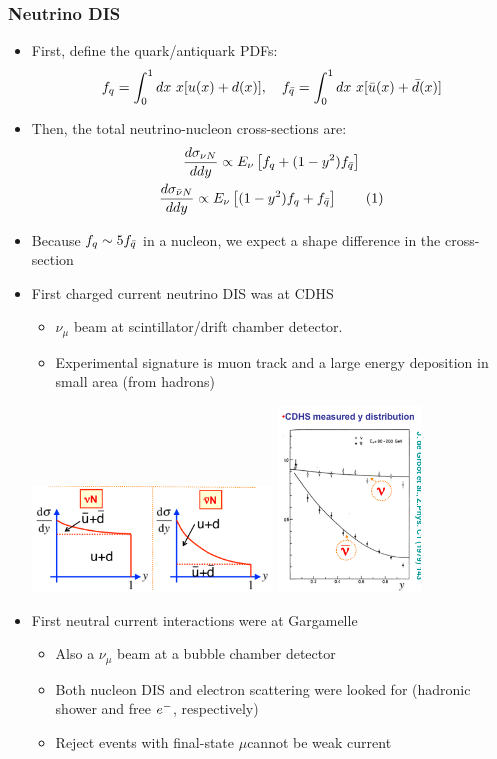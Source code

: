 \subsubsection{Neutrino DIS}
\begin{itemize}
  \item First, define the quark/antiquark PDFs:
  \begin{equation}
    f_q = \int_0^1 dx ~ x[u(x)+d(x)], \quad f_{\bar{q}} = \int_0^1 dx ~ x[\bar{u}(x)+\bar{d}(x)]
  \end{equation}
  \item Then, the total neutrino-nucleon cross-sections are:
  \begin{gather*}
    \dd{\sigma_{\nu N}}{dy} \propto E_\nu \left[ f_q + (1-y^2) f_\qbar\right]\\
    \dd{\sigma_{\nubar N}}{dy} \propto E_\nu \left[(1-y^2)  f_q + f_\qbar\right]\numberthis
  \end{gather*}
  \item Because $f_q \sim 5 f_{\bar{q}}$ in a nucleon, we expect a shape difference in the cross-section
  \item First charged current neutrino DIS was at CDHS
  \begin{itemize}
    \item $\nu_\mu$ beam at scintillator/drift chamber detector. 
    \item Experimental signature is muon track and a large energy deposition in small area (from hadrons)
  \end{itemize}
  \begin{center}
    \includegraphics[width=0.5\textwidth,valign=c]{figs/nudis.png}
    \includegraphics[width=0.3\textwidth,valign=c]{figs/cdhs.png}
  \end{center}
  \item First neutral current interactions were at Gargamelle
  \begin{itemize}
    \item Also a $\nu_\mu$ beam at a bubble chamber detector
    \item Both nucleon DIS and electron scattering were looked for (hadronic shower and free $e^{-}$, respectively)
    \item Reject events with final-state $\mu$\thus cannot be weak current
  \end{itemize}
\end{itemize}

